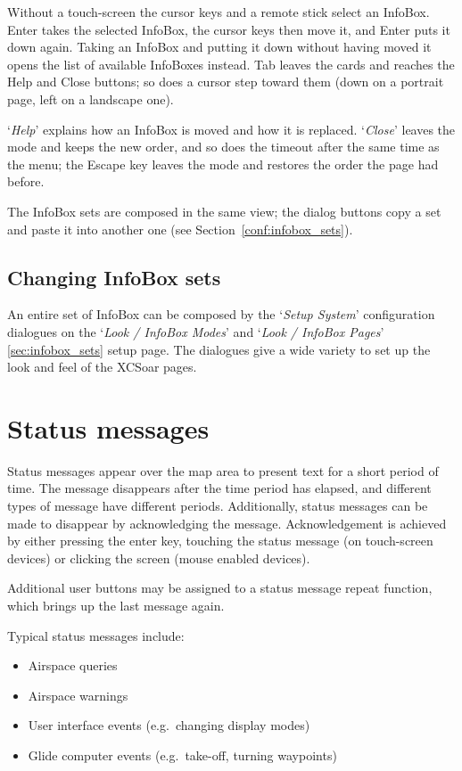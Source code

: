 Without a touch-screen the cursor keys and a remote stick select an
InfoBox.  Enter takes the selected InfoBox, the cursor keys then move
it, and Enter puts it down again.  Taking an InfoBox and putting it
down without having moved it opens the list of available InfoBoxes
instead.  Tab leaves the cards and reaches the Help and Close
buttons; so does a cursor step toward them (down on a portrait page,
left on a landscape one).

`\emph{Help}' explains how an InfoBox is moved and how it is replaced.
`\emph{Close}' leaves the mode and keeps the new order, and so does the
timeout after the same time as the menu; the Escape key leaves the mode
and restores the order the page had before.

The InfoBox sets are composed in the same view; the dialog buttons
copy a set and paste it into another one
(see Section~\ref{conf:infobox_sets}).

\subsection*{Changing InfoBox sets}

An entire set of InfoBox can be composed by the `\emph{Setup System}' configuration 
dialogues on the `\emph{Look / InfoBox Modes}' and `\emph{Look / InfoBox Pages}' 
\ref{sec:infobox_sets} setup page. 
The dialogues give a wide variety to set up the look and feel of the XCSoar pages.  


\section{Status messages}

Status messages appear over the map area to present text for a short period of
time.  The message disappears after the time period has elapsed, and different
types of message have different periods. Additionally, status messages can be
made to disappear by acknowledging the message.  Acknowledgement is achieved by
either pressing the enter key, touching the status
message (on touch-screen devices) or clicking the screen (mouse enabled devices).

Additional user buttons may be assigned to a status message repeat function,
which brings up the last message again.

Typical status messages include:
\begin{itemize}
\item Airspace queries
\item Airspace warnings
\item User interface events (e.g.\ changing display modes)
\item Glide computer events (e.g.\ take-off, turning waypoints)
\end{itemize}

